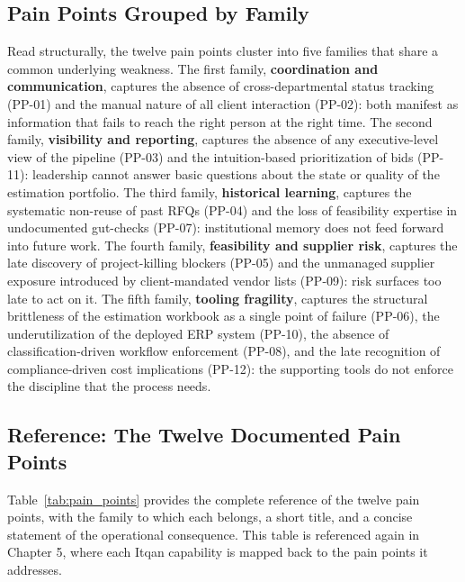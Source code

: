\subsection*{Pain Points Grouped by Family}
Read structurally, the twelve pain points cluster into five families that share a common underlying weakness. The first family, \textbf{coordination and communication}, captures the absence of cross-departmental status tracking (PP-01) and the manual nature of all client interaction (PP-02): both manifest as information that fails to reach the right person at the right time. The second family, \textbf{visibility and reporting}, captures the absence of any executive-level view of the pipeline (PP-03) and the intuition-based prioritization of bids (PP-11): leadership cannot answer basic questions about the state or quality of the estimation portfolio. The third family, \textbf{historical learning}, captures the systematic non-reuse of past RFQs (PP-04) and the loss of feasibility expertise in undocumented gut-checks (PP-07): institutional memory does not feed forward into future work. The fourth family, \textbf{feasibility and supplier risk}, captures the late discovery of project-killing blockers (PP-05) and the unmanaged supplier exposure introduced by client-mandated vendor lists (PP-09): risk surfaces too late to act on it. The fifth family, \textbf{tooling fragility}, captures the structural brittleness of the estimation workbook as a single point of failure (PP-06), the underutilization of the deployed ERP system (PP-10), the absence of classification-driven workflow enforcement (PP-08), and the late recognition of compliance-driven cost implications (PP-12): the supporting tools do not enforce the discipline that the process needs.

\subsection*{Reference: The Twelve Documented Pain Points}
Table~\ref{tab:pain_points} provides the complete reference of the twelve pain points, with the family to which each belongs, a short title, and a concise statement of the operational consequence. This table is referenced again in Chapter 5, where each Itqan capability is mapped back to the pain points it addresses.

